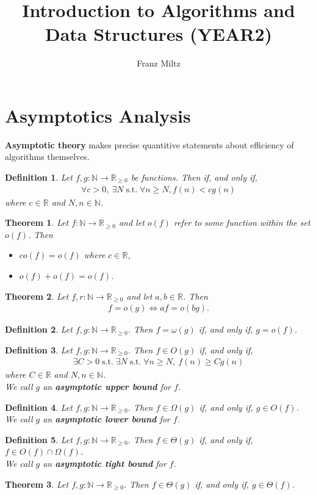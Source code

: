 \documentclass{article}
\DeclareMathOperator{\st}{s.t.}
\theoremstyle{sltheorem}
\newtheorem{definition}{Definition}[section]
\newtheorem{theorem}{Theorem}[section]
\newcommand{\R}{\mathbb{R}}
\newcommand{\N}{\mathbb{N}}
\newcommand*\B[1]{\textbf{#1}}
\begin{document}
\title{Introduction to Algorithms and Data Structures (YEAR2)}
\author{Franz Miltz}
\maketitle
\tableofcontents  
\section{Asymptotics Analysis}
\B{Asymptotic theory} makes precise quantitive statements about efficiency of algorithms themselves.
\begin{definition}
	Let $f,g:\N\to\R_{\geq 0}$ be functions. Then
	 if, and only if, 
	\begin{align*}
		\forall c>0,\:\exists N\st \forall n \geq N, f(n)<cg(n)
	\end{align*}
	where $c\in\R$ and $N,n\in\N$.
\end{definition}
\begin{theorem}
	Let $f:\N\to\R_{\geq 0}$ and let $o(f)$ refer to some
	function within the set $o(f)$. Then
	\begin{itemize}
		\item $co(f)=o(f)$ where $c\in\R$,
		\item $o(f) + o(f) = o(f)$.
	\end{itemize}
\end{theorem}
\begin{theorem}
	Let $f,r:\N\to\R_{\geq 0}$ and let $a,b\in\R$. Then
	\begin{align*}
		f=o(g) \Leftrightarrow af=o(bg).	
	\end{align*}
\end{theorem}
\begin{definition}
	Let $f,g:\N\to\R_{\geq 0}$. Then $f=\omega(g)$ if, and only if, $g=o(f)$.
\end{definition}
\begin{definition}
	Let $f,g:\N\to\R_{\geq 0}$. Then $f\in O(g)$ if, and only if,
	\begin{align*}
		\exists C > 0\st \exists N \st \forall n \geq N,\: f(n) \geq Cg(n)
	\end{align*}
	where $C\in\R$ and $N,n\in\N$.\\
	We call $g$ an \B{asymptotic upper bound} for $f$.
\end{definition}
\begin{definition}
	Let $f,g:\N\to\R_{\geq 0}$. Then $f\in\Omega(g)$ if, and only if, $g\in O(f)$.\\
	We call $g$ an \B{asymptotic lower bound} for $f$.
\end{definition}
\begin{definition}
	Let $f,g:\N\to\R_{\geq 0}$. Then $f\in\Theta(g)$ if, and only if, $f\in O(f) \cap \Omega(f)$.\\
	We call $g$ an \B{asymptotic tight bound} for $f$.
\end{definition}
\begin{theorem}
	Let $f,g:\N\to\R_{\geq 0}$. Then $f\in\Theta(g)$ if, and only if, $g\in\Theta(f)$.
\end{theorem}
\end{document}
